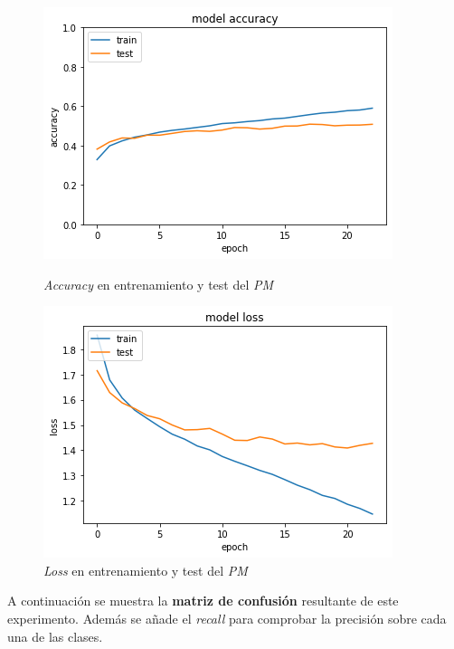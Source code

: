 \documentclass{uc3mpracticas}
\begin{document}
\begin{figure}[!h]
\centering
\begin{minipage}{.52\textwidth}
  \centering
  \includegraphics[width=.8\linewidth]{Images/accuracyPM.png}
  \caption*{\textit{Accuracy} en entrenamiento y test del \textit{PM}}
\end{minipage}%
\begin{minipage}{.52\textwidth}
  \centering
  \includegraphics[width=.8\linewidth]{Images/lossPM.png}
  \caption*{\textit{Loss} en entrenamiento y test del \textit{PM}}
\end{minipage}
\end{figure}


A continuación se muestra la \textbf{matriz de confusión} resultante de este experimento. Además se añade el \textit{recall} para comprobar la precisión sobre cada una de las clases.
\end{document}
